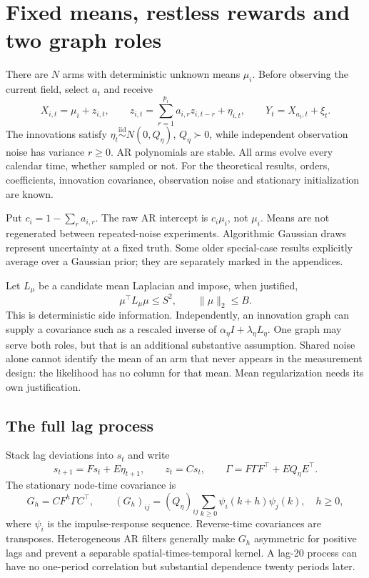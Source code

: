 \section{Fixed means, restless rewards and two graph roles}

There are $N$ arms with deterministic unknown means $\mu_i$. Before observing the current field, select $a_t$ and receive
\begin{equation}
X_{i,t}=\mu_i+z_{i,t},\qquad
z_{i,t}=\sum_{r=1}^{p_i}a_{i,r}z_{i,t-r}+\eta_{i,t},\qquad
Y_t=X_{a_t,t}+\xi_t.
\label{eq:mainmodel}
\end{equation}
The innovations satisfy $\eta_t\stackrel{\mathrm{iid}}\sim N(0,Q_\eta)$, $Q_\eta\succ0$, while independent observation noise has variance $r\ge0$. AR polynomials are stable. All arms evolve every calendar time, whether sampled or not. For the theoretical results, orders, coefficients, innovation covariance, observation noise and stationary initialization are known.

Put $c_i=1-\sum_ra_{i,r}$. The raw AR intercept is $c_i\mu_i$, not $\mu_i$. Means are not regenerated between repeated-noise experiments. Algorithmic Gaussian draws represent uncertainty at a fixed truth. Some older special-case results explicitly average over a Gaussian prior; they are separately marked in the appendices.

Let $L_\mu$ be a candidate mean Laplacian and impose, when justified,
\begin{equation}
\mu^\top L_\mu\mu\le S^2,\qquad \|\mu\|_2\le B.
\end{equation}
This is deterministic side information. Independently, an innovation graph can supply a covariance such as a rescaled inverse of $\alpha_\eta I+\lambda_\eta L_\eta$. One graph may serve both roles, but that is an additional substantive assumption. Shared noise alone cannot identify the mean of an arm that never appears in the measurement design: the likelihood has no column for that mean. Mean regularization needs its own justification.

\subsection{The full lag process}
Stack lag deviations into $s_t$ and write
\begin{equation}
s_{t+1}=Fs_t+E\eta_{t+1},\qquad z_t=Cs_t,\qquad
\Gamma=F\Gamma F^\top+EQ_\eta E^\top.
\end{equation}
The stationary node-time covariance is
\begin{equation}
G_h=CF^h\Gamma C^\top,\qquad
(G_h)_{ij}=(Q_\eta)_{ij}\sum_{k\ge0}\psi_i(k+h)\psi_j(k),\quad h\ge0,
\end{equation}
where $\psi_i$ is the impulse-response sequence. Reverse-time covariances are transposes. Heterogeneous AR filters generally make $G_h$ asymmetric for positive lags and prevent a separable spatial-times-temporal kernel. A lag-20 process can have no one-period correlation but substantial dependence twenty periods later.

